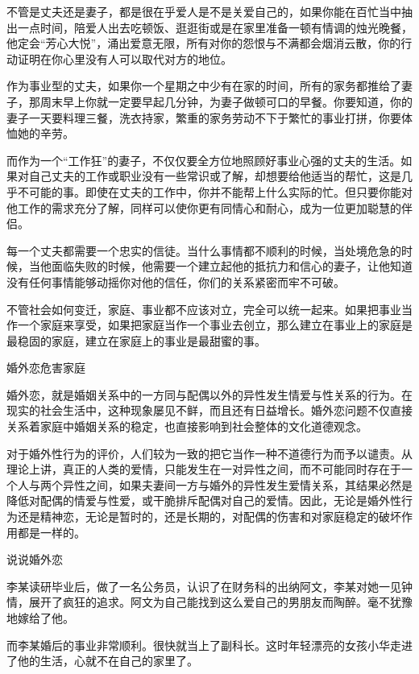 \documentclass[12pt,UTF8]{ctexbook}
\begin{document}
不管是丈夫还是妻子，都是很在乎爱人是不是关爱自己的，如果你能在百忙当中抽出一点时间，陪爱人出去吃顿饭、逛逛街或是在家里准备一顿有情调的烛光晚餐，他定会“芳心大悦”，涌出爱意无限，所有对你的怨恨与不满都会烟消云散，你的行动证明在你心里没有人可以取代对方的地位。

作为事业型的丈夫，如果你一个星期之中少有在家的时间，所有的家务都推给了妻子，那周末早上你就一定要早起几分钟，为妻子做顿可口的早餐。你要知道，你的妻子一天要料理三餐，洗衣持家，繁重的家务劳动不下于繁忙的事业打拼，你要体恤她的辛劳。

而作为一个“工作狂”的妻子，不仅仅要全方位地照顾好事业心强的丈夫的生活。如果对自己丈夫的工作或职业没有一些常识或了解，却想要给他适当的帮忙，这是几乎不可能的事。即使在丈夫的工作中，你并不能帮上什么实际的忙。但只要你能对他工作的需求充分了解，同样可以使你更有同情心和耐心，成为一位更加聪慧的伴侣。

每一个丈夫都需要一个忠实的信徒。当什么事情都不顺利的时候，当处境危急的时候，当他面临失败的时候，他需要一个建立起他的抵抗力和信心的妻子，让他知道没有任何事情能够动摇你对他的信任，你们的关系紧密而牢不可破。

不管社会如何变迁，家庭、事业都不应该对立，完全可以统一起来。如果把事业当作一个家庭来享受，如果把家庭当作一个事业去创立，那么建立在事业上的家庭是最稳固的家庭，建立在家庭上的事业是最甜蜜的事。





婚外恋危害家庭


婚外恋，就是婚姻关系中的一方同与配偶以外的异性发生情爱与性关系的行为。在现实的社会生活中，这种现象屡见不鲜，而且还有日益增长。婚外恋问题不仅直接关系着家庭中婚姻关系的稳定，也直接影响到社会整体的文化道德观念。

对于婚外性行为的评价，人们较为一致的把它当作一种不道德行为而予以谴责。从理论上讲，真正的人类的爱情，只能发生在一对异性之间，而不可能同时存在于一个人与两个异性之间，如果夫妻间一方与婚外的异性发生爱情关系，其结果必然是降低对配偶的情爱与性爱，或干脆排斥配偶对自己的爱情。因此，无论是婚外性行为还是精神恋，无论是暂时的，还是长期的，对配偶的伤害和对家庭稳定的破坏作用都是一样的。





说说婚外恋


李某读研毕业后，做了一名公务员，认识了在财务科的出纳阿文，李某对她一见钟情，展开了疯狂的追求。阿文为自己能找到这么爱自己的男朋友而陶醉。毫不犹豫地嫁给了他。

而李某婚后的事业非常顺利。很快就当上了副科长。这时年轻漂亮的女孩小华走进了他的生活，心就不在自己的家里了。
\end{document}
